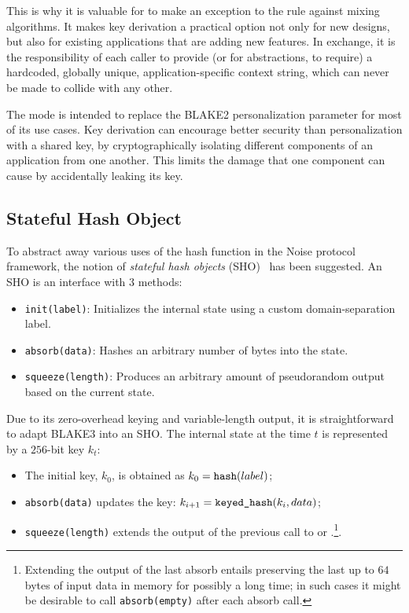 \documentclass[11pt,notitlepage,a4paper]{article}
\newcommand{\flag}[1]{\texttt{\detokenize{#1}}\xspace}
\begin{document}
This is why it is valuable for \flag{derive_key} to make an exception to the
rule against mixing algorithms. It makes key derivation a practical option not
only for new designs, but also for existing applications that are adding new
features. In exchange, it is the responsibility of each caller to provide (or
for abstractions, to require) a hardcoded, globally unique,
application-specific context string, which can never be made to collide with
any other.

The \flag{derive_key} mode is intended to replace the BLAKE2 personalization
parameter for most of its use cases. Key derivation can encourage better
security than personalization with a shared key, by cryptographically isolating
different components of an application from one another. This limits the damage
that one component can cause by accidentally leaking its key.

\subsection{Stateful Hash Object}\label{sec:sho}

To abstract away various uses of the hash function in the Noise protocol framework, the notion of \emph{stateful hash objects} (SHO)~\cite{Perrin19} has been suggested. An SHO is an interface with 3 methods:
\begin{itemize}
  \item \texttt{init(label)}: Initializes the internal state using a custom domain-separation label.
  \item \texttt{absorb(data)}: Hashes an arbitrary number of bytes into the state.
  \item \texttt{squeeze(length)}: Produces an arbitrary amount of pseudorandom output based on the current state.
\end{itemize}
Due to its zero-overhead keying and variable-length output, it is straightforward to adapt BLAKE3 into an SHO. The internal state at the time $t$ is represented by a $256$-bit key $k_t$:
\begin{itemize}
  \item The initial key, $k_0$, is obtained as $k_0 = \text{\flag{hash}}(label)$;
  \item \texttt{absorb(data)} updates the key: $k_{i+1} = \text{\flag{keyed_hash}}(k_i, data)$;
  \item \texttt{squeeze(length)} extends the output of the previous call to \flag{hash} or \flag{keyed_hash}.\footnote{Extending the output of the last absorb entails preserving the last up to $64$ bytes of input data in memory for possibly a long time; in such cases it might be desirable to call \texttt{absorb(empty)} after each absorb call.}.
\end{itemize}
\end{document}
